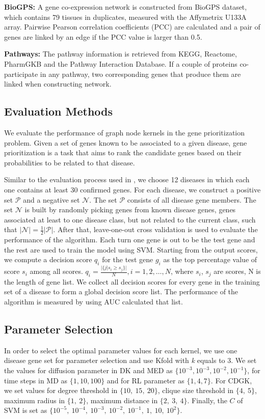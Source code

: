 \documentclass{esannV2}
\begin{document}
\textbf{BioGPS:} A gene co-expression network is constructed from BioGPS dataset, which contains 79 tissues in duplicates, measured with the Affymetrix U133A array. Pairwise Pearson correlation coefficients (PCC) are calculated and a pair of genes are linked by an edge if the PCC value is larger than 0.5.

\textbf{Pathways:} The pathway information is retrieved from KEGG, Reactome, PharmGKB and the Pathway Interaction Database. If a couple of proteins co-participate in any pathway, two corresponding genes that produce them are linked when constructing network.  
\subsection{Evaluation Methods}
We evaluate the performance of graph node kernels in the gene prioritization problem. Given a set of genes known to be associated to a given disease, gene prioritization is a task that aims to rank the candidate genes based on their probabilities to be related to that disease.

Similar to the evaluation process used in \cite{medk}, we choose 12 diseases in which each one contains at least 30 confirmed genes. For each disease, we construct a positive set $\mathcal{P}$ and a negative set $\mathcal{N}$. The set $\mathcal{P}$ consists of all disease gene members. The set $\mathcal{N}$ is built by randomly picking genes from known disease genes, genes associated at least to one disease class, but not related to the current class, such that $\vert \mathcal{N} \vert = \frac{1}{2} \vert \mathcal{P} \vert$. After that, leave-one-out cross validation is used to evaluate the performance of the algorithm. Each turn one gene is out to be the test gene and the rest are used to train the model using SVM. Starting from the output scores, we compute a decision score $q_i$ for the test gene $g_i$ as the top percentage value of score $s_i$ among all scores. $q_{i} = \frac{\vert \{j\vert s_{i} \geq s_{j}  \rbrace \vert}{N}, i = 1,2,\ldots,N$, where $s_i$, $s_j$ are scores, N is the length of gene list. We collect all decision scores for every gene in the training set of a disease to form a global decision score list. The performance of the algorithm is measured by using AUC calculated that list. 
\subsection{Parameter Selection}
In order to select the optimal parameter values for each kernel, we use one disease gene set for parameter selection and use Kfold with \textit{k} equals to 3. We set the values for diffusion parameter in DK and MED as $\lbrace 10^{-3}, 10^{-3}, 10^{-2}, 10^{-1} \rbrace$, for time steps in MD as $\lbrace 1, 10, 100 \rbrace$ and for RL parameter as $\lbrace 1, 4, 7 \rbrace$. For CDGK, we set values for degree threshold in $\lbrace 10,\ 15,\ 20 \rbrace$, clique size threshold in $\lbrace 4,\ 5 \rbrace$, maximum radius in $\lbrace 1,\ 2 \rbrace$, maximum distance in $\lbrace 2,\ 3,\ 4 \rbrace$. Finally, the $C$ of SVM is set as $\lbrace 10^{-5},  \ 10^{-4}, \ 10^{-3},\ 10^{-2},\ 10^{-1},\ 1,\ 10,\ 10^2 \rbrace$.
\end{document}
